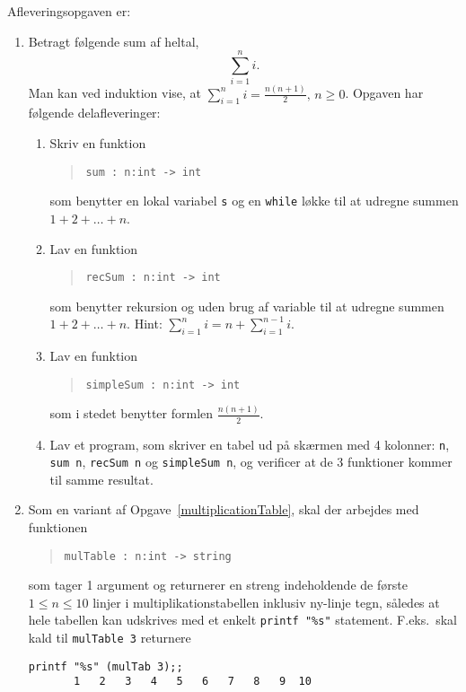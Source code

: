 \documentclass[a4paper,12pt]{article}
\begin{document}
Afleveringsopgaven er:
\begin{enumerate}[label=3i.\arabic*,start=0]
\item Betragt følgende sum af heltal,
  \begin{equation}
    \sum_{i=1}^n i.
  \end{equation}
  Man kan ved induktion vise, at $\sum_{i=1}^n i = \frac{n(n+1)}{2},\, n\geq 0$. Opgaven har følgende delafleveringer:
  \begin{enumerate}
  \item \label{sum} Skriv en funktion
    \begin{quote}
      \mbox{\lstinline!sum : n:int -> int!}
    \end{quote}
    som benytter en lokal variabel \lstinline!s! og en \lstinline!while! løkke til at udregne summen $1 + 2 + \dots + n$.
  \item Lav en funktion
    \begin{quote}
      \mbox{\lstinline!recSum : n:int -> int!}
    \end{quote}
 som benytter rekursion og uden brug af variable til at udregne summen $1 + 2 + \dots + n$. Hint: $\sum_{i=1}^n i = n + \sum_{i=1}^{n-1} i$.
  \item Lav en funktion
    \begin{quote}
      \mbox{\lstinline!simpleSum : n:int -> int!}
    \end{quote}
som i stedet benytter formlen $\frac{n(n+1)}{2}$.
  \item Lav et program, som skriver en tabel ud på skærmen med 4 kolonner: \lstinline!n!, \lstinline!sum n!, \mbox{\lstinline!recSum n!} og \mbox{\lstinline!simpleSum n!}, og verificer at de 3 funktioner kommer til samme resultat.
  \end{enumerate}
\item Som en variant af Opgave~\ref{multiplicationTable}, skal der arbejdes med funktionen
  \begin{quote}
    \mbox{\lstinline!mulTable : n:int -> string!}
  \end{quote}
  som tager 1 argument og returnerer en streng indeholdende de første $1\leq n\leq 10$ linjer i multiplikationstabellen inklusiv ny-linje tegn, således at hele tabellen kan udskrives med et enkelt \lstinline!printf "%s"! statement. F.eks.\ skal kald til \mbox{\lstinline!mulTable 3!} returnere
\begin{lstlisting}[caption=Eksempel på brug og output fra \lstinline!mulTab!,label=mulTab]
printf "%s" (mulTab 3);;
       1   2   3   4   5   6   7   8   9  10

\end{lstlisting}
\end{enumerate}
\end{document}
